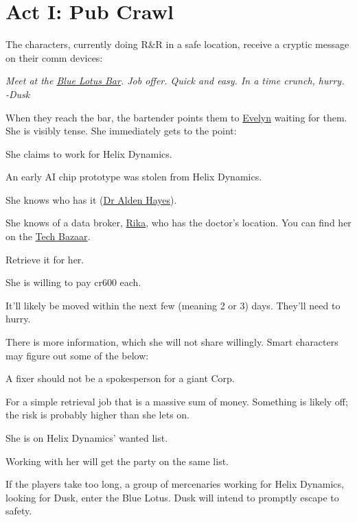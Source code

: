 \chapter{Act I: Pub Crawl}
\label{ch:act1}
\vspace{-20mm} %
The characters, currently doing R\&R in a safe location,
receive a cryptic message on their comm devices:
\begin{exampleblock}
	\itshape
	Meet at the \hyperref[location:bar]{Blue Lotus Bar}.
	Job offer. Quick and easy.
	In a time crunch, hurry.
	\\%
	-Dusk
\end{exampleblock}
When they reach the bar, the bartender points them to \hyperref[char:dusk]{Evelyn} waiting for them.
She is visibly tense.
She immediately gets to the point:
\begin{sitemize}
	\item She claims to work for Helix Dynamics.
	\item An early AI chip prototype was stolen from Helix Dynamics.
	\item She knows who has it (\hyperref[char:hayes]{Dr Alden Hayes}).
	\item She knows of a data broker, \hyperref[char:rika]{Rika},
		who has the doctor's location.
		You can find her on the \hyperref[location:techbazaar]{Tech Bazaar}.
	\item Retrieve it for her.
	\item She is willing to pay cr600 each.
	\item It'll likely be moved within the next few (meaning 2 or 3) days.
		They'll need to hurry.
\end{sitemize}
\vspace{-5mm}
There is more information,
	which she will not share willingly.
Smart characters may figure out some of the below:
\begin{sitemize}
	\item A fixer should not be a spokesperson for a giant Corp.
	\item For a simple retrieval job that is a massive sum of money.
		Something is likely off; the risk is probably higher than she lets on.
	\item She is on Helix Dynamics' wanted list.
	\item Working with her will get the party on the same list.
\end{sitemize}

\vspace{-5mm}
If the players take too long,
	a group of mercenaries working for Helix Dynamics,
	looking for Dusk,
	enter the Blue Lotus.
Dusk will intend to promptly escape to safety.
